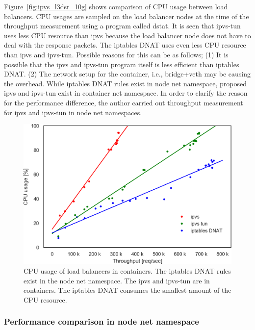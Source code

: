 Figure~\ref{fig:ipvs_l3dsr_10g} shows comparison of CPU usage between load balancers.
CPU usages are sampled on the load balancer nodes at the time of the throughput measurement using a program called dstat\cite{wieers2019dstat}.
It is seen that ipvs-tun uses less CPU resource than ipvs because the load balancer node does not have to deal with the response packets.
The iptables DNAT uses even less CPU resource than ipvs and ipvs-tun.
Possible reasons for this can be as follows;
(1) It is possible that the ipvs and ipvs-tun program itself is less efficient than iptables DNAT.
(2) The network setup for the container, i.e., bridge+veth may be causing the overhead.
While iptables DNAT rules exist in node net namespace, proposed ipvs and ipvs-tun exist in container net namespace. 
In order to clarify the reason for the performance difference, the author carried out throughput measurement for ipvs and ipvs-tun in node net namespaces.

\begin{figure}[h]
  \centering
  \includegraphics[width=0.8\columnwidth]{Figs/cpu_usage_10g}
  \par\bigskip
  \centering
  \begin{minipage}{0.9\columnwidth}
    \caption[CPU usage of load balancers in containers]{
      CPU usage of load balancers in containers.
      The iptables DNAT rules exist in the node net namespace.
      The ipvs and ipvs-tun are in containers.
      The iptables DNAT consumes the smallest amount of the CPU resource.
    }
    \label{fig:cpu_usage_10g}
  \end{minipage}
\end{figure}

\FloatBarrier

\subsubsection{Performance comparison in node net namespace}

